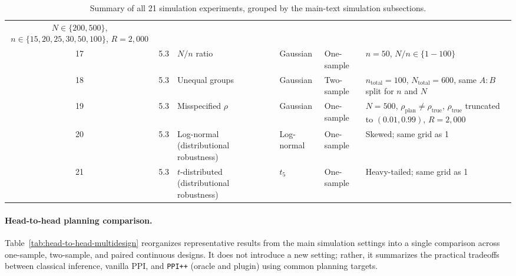 \begin{table}[!ht]
\begin{tabular}{@{}cclllp{4.0cm}@{}}
  $N{\in}\{200,500\}$, $n{\in}\{15,20,25,30,50,100\}$, $R{=}2{,}000$ \\
17 & 5.3 & $N/n$ ratio & Gaussian & One-sample &
  $n{=}50$, $N/n{\in}\{1{-}100\}$ \\
18 & 5.3 & Unequal groups & Gaussian & Two-sample &
  $n_{\text{total}}{=}100$, $N_{\text{total}}{=}600$, same $A{:}B$ split for $n$ and $N$ \\
19 & 5.3 & Misspecified $\rho$ & Gaussian & One-sample &
  $N{=}500$, $\rho_{\text{plan}}{\neq}\rho_{\text{true}}$, $\rho_{\text{true}}$ truncated to $(0.01,0.99)$, $R{=}2{,}000$ \\
\midrule
20 & 5.3 & Log-normal (distributional robustness) & Log-normal & One-sample &
  Skewed; same grid as 1 \\
21 & 5.3 & $t$-distributed (distributional robustness) & $t_5$ & One-sample &
  Heavy-tailed; same grid as 1 \\
\bottomrule
\end{tabular}
\caption{Summary of all 21 simulation experiments, grouped by the
  main-text simulation subsections.}
\label{tab:simulation-settings}
\end{table}
\fi

\paragraph{Head-to-head planning comparison.}
Table~\ref{tab:head-to-head-multidesign} reorganizes representative
results from the main simulation settings into a single comparison
across one-sample, two-sample, and paired continuous designs.  It does
not introduce a new setting; rather, it summarizes the practical
tradeoffs between classical inference, vanilla PPI, and
\texttt{PPI++} (oracle and plugin) using common planning targets.


